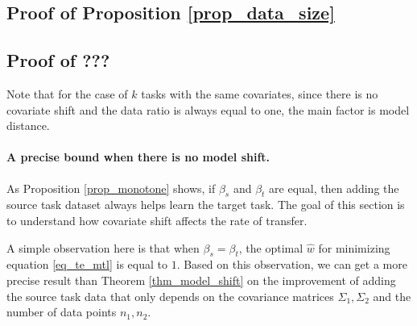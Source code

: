 \subsection{Proof of Proposition \ref{prop_data_size}}



\subsection{Proof of ???}
Note that for the case of $k$ tasks with the same covariates, since there is no covariate shift and the data ratio is always equal to one, the main factor is model distance.

\paragraph{A precise bound when there is no model shift.}
As Proposition \ref{prop_monotone} shows, if $\beta_s$ and $\beta_t$ are equal, then adding the source task dataset always helps learn the target task.
The goal of this section is to understand how covariate shift affects the rate of transfer. 


A simple observation here is that when $\beta_s = \beta_t$, the optimal $\hat{w}$ for minimizing equation \eqref{eq_te_mtl} is equal to $1$.
Based on this observation, we can get a more precise result than Theorem \ref{thm_model_shift} on the improvement of adding the source task data that only depends on the covariance matrices $\Sigma_1, \Sigma_2$ and the number of data points $n_1, n_2$.



